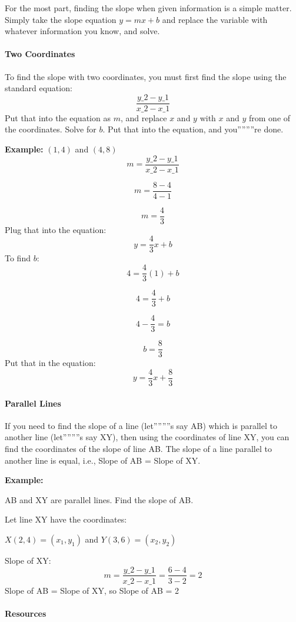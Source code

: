 
For the most part, finding the slope when given information is a simple matter. Simply take the slope equation $y = mx + b$ and replace the variable with whatever information you know, and solve.

\paragraph{Two Coordinates}

To find the slope with two coordinates, you must first find the slope using the standard equation:
$$
\frac{y\_2 - y\_1}{x\_2 - x\_1}
$$
Put that into the equation as $m$, and replace $x$ and $y$ with $x$ and $y$ from one of the coordinates. Solve for $b$. Put that into the equation, and you''''''''re done.

\textbf{Example:} $(1, 4)$ and $(4, 8)$
$$
m = \frac{y\_2 - y\_1}{x\_2 - x\_1}
$$

$$
m = \frac{8 - 4}{4 - 1}
$$

$$
m = \frac{4}{3}
$$
Plug that into the equation:
$$
y = \frac{4}{3}x + b
$$
To find $b$:
$$
4 = \frac{4}{3}(1) + b
$$

$$
4 = \frac{4}{3} + b
$$

$$
4 - \frac{4}{3} = b
$$

$$
b = \frac{8}{3}
$$
Put that in the equation:
$$
y = \frac{4}{3}x + \frac{8}{3}
$$
\paragraph{Parallel Lines}

If you need to find the slope of a line (let''''''''s say AB) which is parallel to another line (let''''''''s say XY), then using the coordinates of line XY, you can find the coordinates of the slope of line AB. The slope of a line parallel to another line is equal, i.e., Slope of AB = Slope of XY.

\textbf{Example:}

AB and XY are parallel lines. Find the slope of AB.

Let line XY have the coordinates:

$X(2, 4) = (x_1, y_1)$ and $Y(3, 6) = (x_2, y_2)$

Slope of XY:
$$
m = \frac{y\_2 - y\_1}{x\_2 - x\_1} = \frac{6 - 4}{3 - 2} = 2
$$
Slope of AB = Slope of XY, so Slope of AB = 2

\paragraph{Resources}

